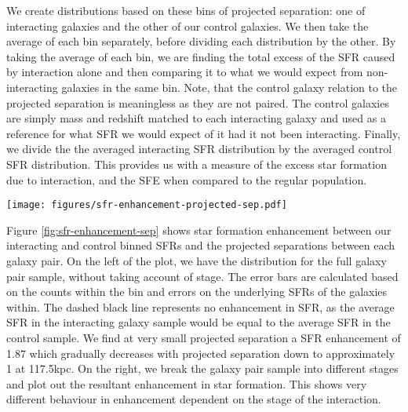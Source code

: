 \documentclass[fleqn,usenatbib]{mnras}
\begin{document}
We create distributions based on these bins of projected separation: one of interacting galaxies and the other of our control galaxies. We then take the average of each bin separately, before dividing each distribution by the other. By taking the average of each bin, we are finding the total excess of the SFR caused by interaction alone and then comparing it to what we would expect from non-interacting galaxies in the same bin. Note, that the control galaxy relation to the projected separation is meaningless as they are not paired. The control galaxies are simply mass and redshift matched to each interacting galaxy and used as a reference for what SFR we would expect of it had it not been interacting. Finally, we divide the the averaged interacting SFR distribution by the averaged control SFR distribution. This provides us with a measure of the excess star formation due to interaction, and the SFE when compared to the regular population.

\begin{figure*}
    \centering
    \texttt{[image: figures/sfr-enhancement-projected-sep.pdf]}
    \caption{The projected separation against the star formation enhancement in average star formation at different bins of projected separation. Each bin must contain at least 10 counts to be considered. As the bulk of our galaxy pair sample is at low projected separation, we heavily sample from this region of the parameter space. The bins are: [0.5, 10, 20, 50, 100, 125] kpc. As we move to higher projected separation, the bins increase in width to maintain statistical significance in our sample. \textit{Left}: The star formation enhancement found in the entire galaxy pair sample. As expected, we see a gradually decreasing enhancement. \textit{Right}: As left but broken up into different stages of the interaction. Black markers are stage 1, red stage 2 and blue stage 3. We only investigate stages 1,2 and 3 as only three galaxy pairs were identified in stage 4. Here, we find a generally decreasing star formation enhancement with projected separation but very different individual behaviour dependent on the stage classification.}
    \label{fig:sfr-enhancement-sep}
\end{figure*}

Figure \ref{fig:sfr-enhancement-sep} shows star formation enhancement between our interacting and control binned SFRs and the projected separations between each galaxy pair. On the left of the plot, we have the distribution for the full galaxy pair sample, without taking account of stage. The error bars are calculated based on the counts within the bin and errors on the underlying SFRs of the galaxies within. The dashed black line represents no enhancement in SFR, as the average SFR in the interacting galaxy sample would be equal to the average SFR in the control sample. We find at very small projected separation a SFR enhancement of 1.87 which gradually decreases with projected separation down to approximately 1 at 117.5kpc. On the right, we break the galaxy pair sample into different stages and plot out the resultant enhancement in star formation. This shows very different behaviour in enhancement dependent on the stage of the interaction.
\end{document}
